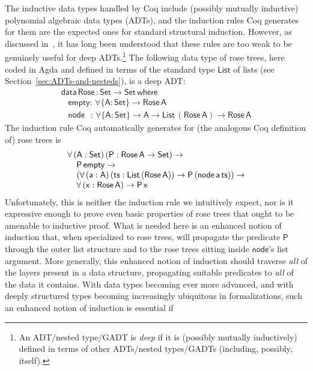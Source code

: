 \documentclass[sigplan,screen]{acmart}
\begin{document}
The inductive data types handled by Coq include (possibly mutually
inductive) polynomial algebraic data types (ADTs), and the induction
rules Coq generates for them are the expected ones for standard
structural induction. However, as discussed in~\cite{jp20}, it has
long been understood that these rules are too weak to be genuinely
useful for deep ADTs.\footnote{An ADT/nested type/GADT is {\em deep}
  if it is (possibly mutually inductively) defined in terms of other
  ADTs/nested types/GADTs (including, possibly, itself).}  The
following data type of rose trees, here coded in Agda and defined in
terms of the standard type $\mathsf{List}$ of lists (see
Section~\ref{sec:ADTs-and-nesteds}), is a deep ADT:
\[\begin{array}{l}
\mathsf{data\, Rose\, : Set \to Set\,where}\\
\mathsf{\;\;\;empty :\,\forall \{A : Set\} \to Rose\,A}\\
\mathsf{\;\;\;node\,\,\,\, :\, \forall \{A : Set\} \to A \to List\,(Rose\,A) \to Rose\,A} 
\end{array}\]
The induction rule Coq automatically generates for (the analogous Coq
definition of) rose trees is
\[\begin{array}{l}
\mathsf{\forall\, (A : Set)\,(P : Rose\,A \to Set) \to}\\
\mathsf{\hspace*{0.15in}P\,empty \to}\\
\mathsf{\hspace*{0.15in}
 (\forall\, (a : A)\,(ts :
  List\,(Rose\,A)) \to P\,(node\,a\,ts)) \to}\\ 
\hspace*{0.15in}  \mathsf{\forall \,(x : Rose\,A) \to P\,x}
\end{array}\]
\noindent
Unfortunately, this is neither the induction rule we intuitively
expect, nor is it expressive enough to prove even basic properties of
rose trees that ought to be amenable to inductive proof. What is
needed here is an enhanced notion of induction that, when specialized
to rose trees, will propagate the predicate $\mathsf{P}$ through the
outer list structure and to the rose trees sitting inside
$\mathsf{node}$'s list argument. More generally, this enhanced notion
of induction should traverse {\em all} of the layers present in a data
structure, propagating suitable predicates to {\em all} of the data it
contains.  With data types becoming ever more advanced, and with
deeply structured types becoming increasingly ubiquitous in
formalizations, such an enhanced notion of induction is essential if
\end{document}
